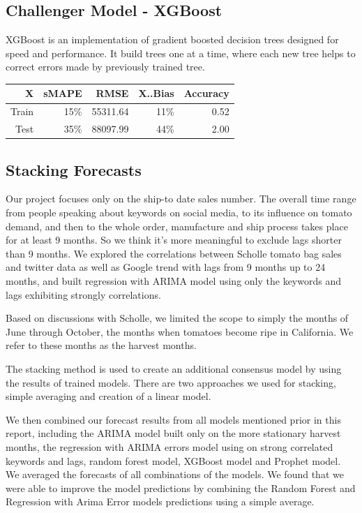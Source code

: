 \documentclass[12pt,oneside]{chicagocapstone}
\begin{document}
\subsection*{Challenger Model -
XGBoost}\label{challenger-model---xgboost}

XGBoost is an implementation of gradient boosted decision trees designed
for speed and performance. It build trees one at a time, where each new
tree helps to correct errors made by previously trained tree.
\begin{longtable}[]{@{}rrrrr@{}}
\toprule
X & sMAPE & RMSE & X..Bias & Accuracy\tabularnewline
\midrule
\endhead
Train & 15\% & 55311.64 & 11\% & 0.52\tabularnewline
Test & 35\% & 88097.99 & 44\% & 2.00\tabularnewline
\bottomrule
\end{longtable}
\subsection*{Stacking Forecasts}\label{stacking-forecasts}

Our project focuses only on the ship-to date sales number. The overall
time range from people speaking about keywords on social media, to its
influence on tomato demand, and then to the whole order, manufacture and
ship process takes place for at least 9 months. So we think it's more
meaningful to exclude lags shorter than 9 months. We explored the
correlations between Scholle tomato bag sales and twitter data as well
as Google trend with lags from 9 months up to 24 months, and built
regression with ARIMA model using only the keywords and lags exhibiting
strongly correlations.

Based on discussions with Scholle, we limited the scope to simply the
months of June through October, the months when tomatoes become ripe in
California. We refer to these months as the harvest months.

The stacking method is used to create an additional consensus model by
using the results of trained models. There are two approaches we used
for stacking, simple averaging and creation of a linear model.

We then combined our forecast results from all models mentioned prior in
this report, including the ARIMA model built only on the more stationary
harvest months, the regression with ARIMA errors model using on strong
correlated keywords and lags, random forest model, XGBoost model and
Prophet model. We averaged the forecasts of all combinations of the
models. We found that we were able to improve the model predictions by
combining the Random Forest and Regression with Arima Error models
predictions using a simple average.
\end{document}
